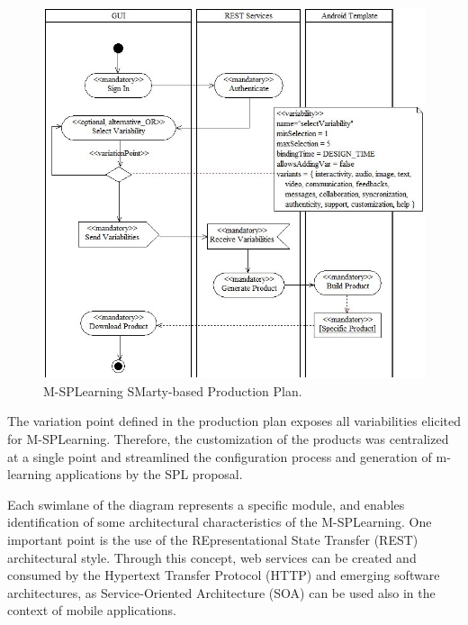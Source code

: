 \begin{figure}
\centering
\includegraphics[scale=0.4]{figures/section3/MSPLProductionPlan}
\caption{M-SPLear\allowbreak ning SMarty-based Production Plan.}
\label{figureMSPLProductionPlan}
\end{figure}

The variation point defined in the production plan exposes all variabilities elicited for M-SPLear\allowbreak ning. Therefore, the customization of the products was centralized at a single point and streamlined the configuration process and generation of m-learning applications by the SPL proposal.

Each swimlane of the diagram represents a specific module, and enables identification of some architectural characteristics of the M-SPLear\allowbreak ning. One important point is the use of the REpresentational State Transfer (REST) \cite{fielding00} architectural style. Through this concept, web services can be created and consumed by the Hypertext Transfer Protocol (HTTP) and emerging software architectures, as Service-Oriented Architecture (SOA) can be used also in the context of mobile applications.

